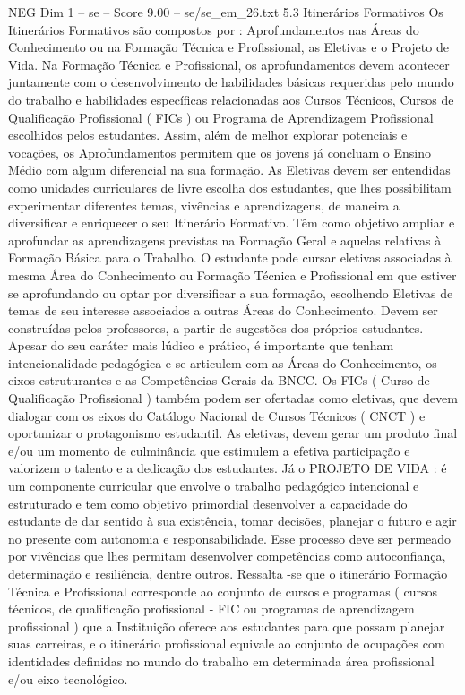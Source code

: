 \begin{textsample}{NEG Dim 1 – se – Score 9.00 – se/se\_em\_26.txt}  \label{ex:f1_neg_207}
5.3 Itinerários Formativos Os Itinerários Formativos são compostos por : Aprofundamentos nas Áreas do Conhecimento ou na Formação Técnica e Profissional, as Eletivas e o Projeto de Vida.
Na Formação Técnica e Profissional, os aprofundamentos devem acontecer juntamente com o desenvolvimento de habilidades básicas requeridas pelo mundo do trabalho e habilidades específicas relacionadas aos Cursos Técnicos, Cursos de Qualificação Profissional ( FICs ) ou Programa de Aprendizagem Profissional escolhidos pelos estudantes.
Assim, além de melhor explorar potenciais e vocações, os Aprofundamentos permitem que os jovens já concluam o Ensino Médio com algum diferencial na sua formação.
As Eletivas devem ser entendidas como unidades curriculares de livre escolha dos estudantes, que lhes possibilitam experimentar diferentes temas, vivências e aprendizagens, de maneira a diversificar e enriquecer o seu Itinerário Formativo.
Têm como objetivo ampliar e aprofundar as aprendizagens previstas na Formação Geral e aquelas relativas à Formação Básica para o Trabalho.
O estudante pode cursar eletivas associadas à mesma Área do Conhecimento ou Formação Técnica e Profissional em que estiver se aprofundando ou optar por diversificar a sua formação, escolhendo Eletivas de temas de seu interesse associados a outras Áreas do Conhecimento.
Devem ser construídas pelos professores, a partir de sugestões dos próprios estudantes.
Apesar do seu caráter mais lúdico e prático, é importante que tenham intencionalidade pedagógica e se articulem com as Áreas do Conhecimento, os eixos estruturantes e as Competências Gerais da BNCC.
Os FICs ( Curso de Qualificação Profissional ) também podem ser ofertadas como eletivas, que devem dialogar com os eixos do Catálogo Nacional de Cursos Técnicos ( CNCT ) e oportunizar o protagonismo estudantil.
As eletivas, devem gerar um produto final e/ou um momento de culminância que estimulem a efetiva participação e valorizem o talento e a dedicação dos estudantes.
Já o PROJETO DE VIDA : é um componente curricular que envolve o trabalho pedagógico intencional e estruturado e tem como objetivo primordial desenvolver a capacidade do estudante de dar sentido à sua existência, tomar decisões, planejar o futuro e agir no presente com autonomia e responsabilidade.
Esse processo deve ser permeado por vivências que lhes permitam desenvolver competências como autoconfiança, determinação e resiliência, dentre outros.
Ressalta -se que o itinerário Formação Técnica e Profissional corresponde ao conjunto de cursos e programas ( cursos técnicos, de qualificação profissional - FIC ou programas de aprendizagem profissional ) que a Instituição oferece aos estudantes para que possam planejar suas carreiras, e o itinerário profissional equivale ao conjunto de ocupações com identidades definidas no mundo do trabalho em determinada área profissional e/ou eixo tecnológico.

\end{textsample}
